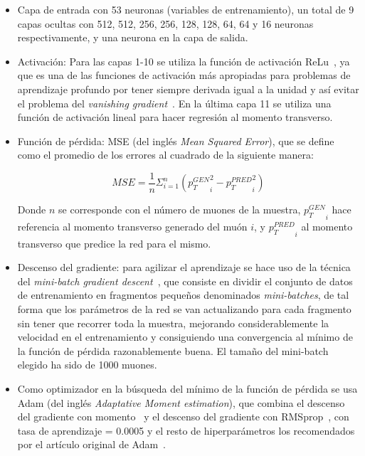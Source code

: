 \begin{itemize}

\item Capa de entrada con 53 neuronas (variables de entrenamiento), un total de 9 capas ocultas con 512, 512, 256, 256, 128, 128, 64, 64 y 16 neuronas respectivamente, y una neurona en la capa de salida.

\item Activaci\'on: Para las capas 1-10 se utiliza la funci\'on de activaci\'on ReLu~\cite{agarap2018deep}, ya que es una de las funciones de activaci\'on m\'as apropiadas para problemas de aprendizaje profundo por tener siempre derivada igual a la unidad y as\'i evitar el problema del \textit{vanishing gradient}~\cite{Hochreiter:91}. En la \'ultima capa 11 se utiliza una funci\'on de activaci\'on lineal para hacer regresi\'on al momento transverso.

\item Funci\'on de p\'erdida: MSE (del ingl\'es \textit{Mean Squared Error}), que se define como el promedio de los errores al cuadrado de la siguiente manera:

\begin{equation}
  MSE = \frac{1}{n}\Sigma_{i=1}^{n}{\left({p_{T}^{GEN}}_i^2 - {p_{T}^{PRED}}_i^2\right)}
\label{eq:MSE}
\end{equation}

Donde $n$ se corresponde con el n\'umero de muones de la muestra, ${p_{T}^{GEN}}_i$ hace referencia al momento transverso generado del mu\'on $i$, y ${p_{T}^{PRED}}_i$ al momento transverso que predice la red para el mismo. 

\item Descenso del gradiente: para agilizar el aprendizaje se hace uso de la t\'ecnica del \textit{mini-batch gradient descent}~\cite{perrone2019optimal}, que consiste en dividir el conjunto de datos de entrenamiento en fragmentos peque\~nos denominados \textit{mini-batches}, de tal forma que los par\'ametros de la red se van actualizando para cada fragmento sin tener que recorrer toda la muestra, mejorando considerablemente la velocidad en el entrenamiento y consiguiendo una convergencia al m\'inimo de la funci\'on de p\'erdida razonablemente buena. El tama\~no del mini-batch elegido ha sido de 1000 muones.

\item Como optimizador en la b\'usqueda del m\'inimo de la funci\'on de p\'erdida se usa Adam (del ingl\'es \textit{Adaptative Moment estimation}), que combina el descenso del gradiente con momento~\cite{PMID:12662723} y el descenso del gradiente con RMSprop~\cite{tieleman2012lecture}, con tasa de aprendizaje = 0.0005 y el resto de hiperpar\'ametros los recomendados por el art\'iculo original de Adam~\cite{Kingma2015AdamAM}.


\end{itemize}
